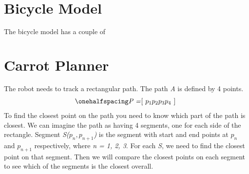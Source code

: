 \documentclass[12pt]{article}
\begin{document}


\newpage
\singlespacing
{}
\section{Bicycle Model}
\setlength{\parindent}{1cm}

The bicycle model has a couple of 



\newpage
\singlespacing
\section{Carrot Planner}
\setlength{\parindent}{1cm}

The robot needs to track a rectangular path. The path \textit{A} is defined by 4 points.
\begin{equation}
\onehalfspacing
\centering
\emph{P =\textnormal{\lbrack} $p_1 p_2 p_3 p_4$ \textnormal{\rbrack} }
\end{equation}
To find the closest point on the path you need to know which part of the path is closest. We can imagine the path as having 4 segments, one for each side of the rectangle. Segment \textit{S($p_n, p_{n+1}$)} is the segment with start and end points at \textit{$p_n$} and \textit{$p_{n+1}$} respectively, where \textit{n = 1, 2, 3}. For each \textit{S}, we need to find the closest point on that segment. Then we will compare the closest points on each segment to see which of the segments is the closest overall. 
\end{document}
